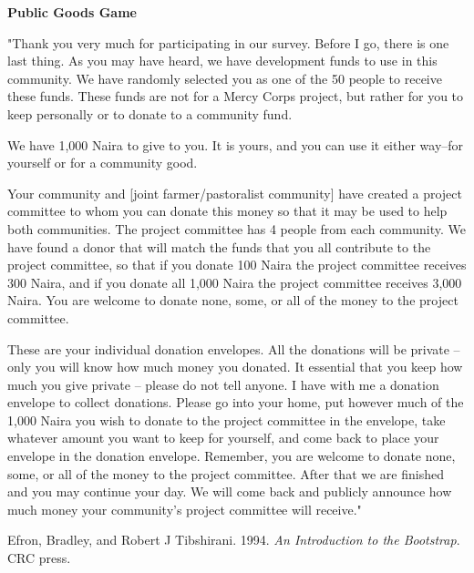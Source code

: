 \documentclass[11pt]{article}
\begin{document}
\textbf{Public Goods Game}

"Thank you very much for participating in our survey. Before I go, there
is one last thing. As you may have heard, we have development funds to
use in this community. We have randomly selected you as one of the 50
people to receive these funds. These funds are not for a Mercy Corps
project, but rather for you to keep personally or to donate to a
community fund.

We have 1,000 Naira to give to you. It is yours, and you can use it
either way--for yourself or for a community good.

Your community and {[}joint farmer/pastoralist community{]} have created
a project committee to whom you can donate this money so that it may be
used to help both communities. The project committee has 4 people from
each community. We have found a donor that will match the funds that you
all contribute to the project committee, so that if you donate 100 Naira
the project committee receives 300 Naira, and if you donate all 1,000
Naira the project committee receives 3,000 Naira. You are welcome to
donate none, some, or all of the money to the project committee.

These are your individual donation envelopes. All the donations will be
private -- only you will know how much money you donated. It essential
that you keep how much you give private -- please do not tell anyone. I
have with me a donation envelope to collect donations. Please go into
your home, put however much of the 1,000 Naira you wish to donate to the
project committee in the envelope, take whatever amount you want to keep
for yourself, and come back to place your envelope in the donation
envelope. Remember, you are welcome to donate none, some, or all of the
money to the project committee. After that we are finished and you may
continue your day. We will come back and publicly announce how much
money your community's project committee will receive."

\hypertarget{refs}{}
\begin{cslreferences}
\leavevmode\hypertarget{ref-efron1994introduction}{}%
Efron, Bradley, and Robert J Tibshirani. 1994. \emph{An Introduction to
the Bootstrap}. CRC press.
\end{cslreferences}
\end{document}
